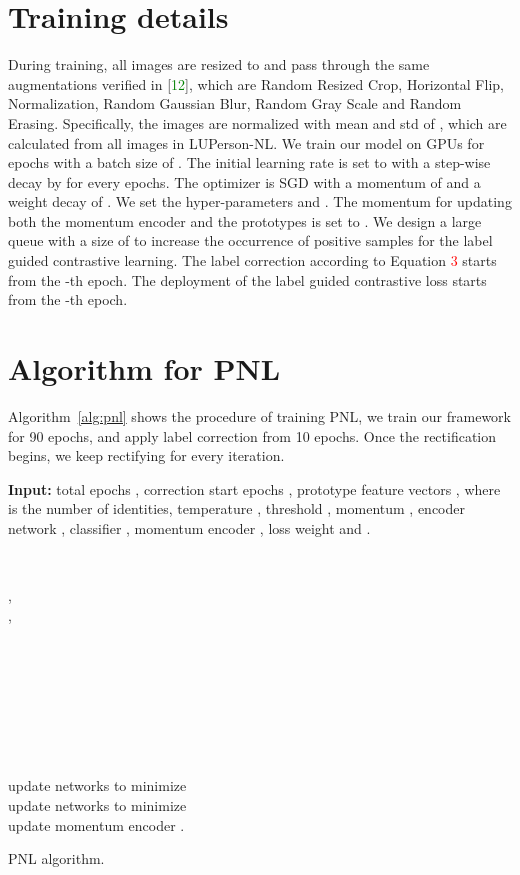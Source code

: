 \documentclass[10pt,twocolumn,letterpaper]{article}
\begin{document}
\section{Training details} 
During training, all images are resized to  and pass through the same augmentations verified in [\textcolor{green}{12}], which are Random Resized Crop, Horizontal Flip, Normalization, Random Gaussian Blur, Random Gray Scale and Random Erasing. 
Specifically, the images are normalized with mean and std of , which are calculated from all images in LUPerson-NL. 
We train our model on  GPUs for  epochs with a batch size of .
The initial learning rate is set to  with a step-wise decay by  for every  epochs. 
The optimizer is SGD with a momentum of  and a weight decay of . 
We set the hyper-parameters  and . 
The momentum  for updating both the momentum encoder  and the prototypes is set to . 
We design a large queue with a size of  to increase the occurrence of positive samples for the label guided contrastive learning. 
The label correction according to Equation \textcolor{red}{3} starts from the -th epoch. 
The deployment of the label guided contrastive loss  starts from the -th epoch.

\section{Algorithm for PNL}
Algorithm~\ref{alg:pnl} shows the procedure of training PNL, we train our framework for 90 epochs, and apply label correction from 10 epochs. Once the rectification begins, we keep rectifying for every iteration.

\begin{algorithm}[ht]
	{
		\textbf{Input:} total epochs , correction start epochs , prototype feature vectors , where  is the number of identities, temperature , threshold , momentum , encoder network , classifier , momentum encoder , loss weight  and .
		
		{
			  \\
			\For {}	
			{
				, 
				 \\
				, 
				 \\
				 \\	
				 \\
				 \\
				
				{}
				\Else{}
				
				 \\
				
				\\ 
				
				
				
				
				 \\
				 \\
update networks  to minimize \\
				update networks  to minimize \\
				update momentum encoder .
			}
		}
	}
	\caption{\small PNL algorithm.}
	\label{alg:pnl}
\end{algorithm}	 
\end{document}
